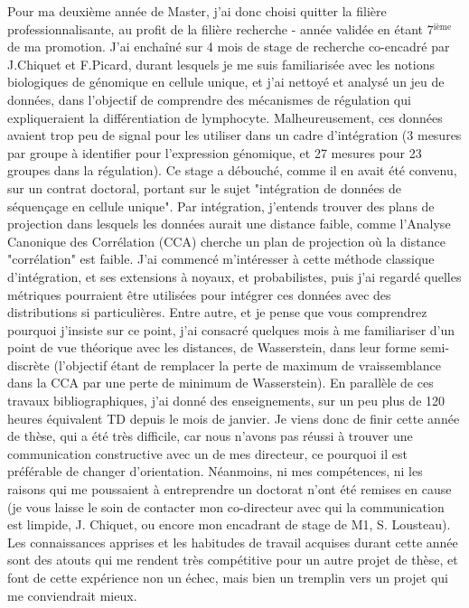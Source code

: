 \documentclass[a4paper,12pt]{article}
\begin{document}
Pour ma deuxième année de Master, j'ai donc choisi quitter la filière professionnalisante, au profit de la filière recherche - année validée en étant 7$^{\text{ième}}$ de ma promotion. 
J'ai enchaîné sur 4 mois de stage de recherche co-encadré par J.Chiquet et F.Picard, durant lesquels je me suis familiarisée avec les notions biologiques de génomique en cellule unique, et j'ai nettoyé et analysé un jeu de données, dans l'objectif de comprendre des mécanismes de régulation qui expliqueraient la différentiation de lymphocyte. Malheureusement, ces données avaient trop peu de signal pour les utiliser dans un cadre d'intégration (3 mesures par groupe à identifier pour l'expression génomique, et 27 mesures pour 23 groupes dans la régulation). Ce stage a débouché, comme il en avait été convenu, sur un contrat doctoral, portant sur le sujet "intégration de données de séquençage en cellule unique". 
Par intégration, j'entends trouver des plans de projection dans lesquels les données aurait une distance faible, comme l'Analyse Canonique des Corrélation (CCA) cherche un plan de projection où la distance "corrélation" est faible. J'ai commencé m'intéresser à cette méthode classique d'intégration, et ses extensions à noyaux, et probabilistes, puis j'ai regardé quelles métriques pourraient être utilisées pour intégrer ces données avec des distributions si particulières. Entre autre, et je pense que vous comprendrez pourquoi j'insiste sur ce point, j'ai consacré quelques mois à me familiariser d'un point de vue théorique avec les distances, de Wasserstein, dans leur forme semi-discrète (l'objectif étant de remplacer la perte de maximum de vraissemblance dans la CCA par une perte de minimum de Wasserstein). En parallèle de ces travaux bibliographiques, j'ai donné des enseignements, sur un peu plus de 120 heures équivalent TD depuis le mois de janvier. 
Je viens donc de finir cette année de thèse, qui a été très difficile, car nous n'avons pas réussi à trouver une communication constructive avec un de mes directeur, ce pourquoi il est préférable de changer d'orientation. 
Néanmoins, ni mes compétences, ni les raisons qui me poussaient à entreprendre un doctorat n'ont été remises en cause (je vous laisse le soin de contacter mon co-directeur avec qui la communication est limpide, J. Chiquet, ou encore mon encadrant de stage de M1, S. Lousteau). 
Les connaissances apprises et les habitudes de travail acquises durant cette année sont des atouts qui me rendent très compétitive pour un autre projet de thèse, et font de cette expérience non un échec, mais bien un tremplin vers un projet qui me conviendrait mieux. 
\end{document}
